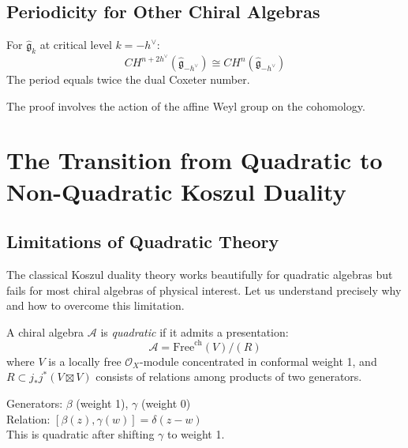 \subsection{Periodicity for Other Chiral Algebras}

\begin{theorem}
For $\hat{\mathfrak{g}}_{k}$ at critical level $k = -h^{\vee}$:
\[
CH^{n+2h^{\vee}}(\hat{\mathfrak{g}}_{-h^{\vee}}) \cong CH^n(\hat{\mathfrak{g}}_{-h^{\vee}})
\]
The period equals twice the dual Coxeter number.
\end{theorem}

The proof involves the action of the affine Weyl group on the cohomology.


\section{The Transition from Quadratic to Non-Quadratic Koszul Duality}

\subsection{Limitations of Quadratic Theory}

The classical Koszul duality theory works beautifully for quadratic algebras but fails for most chiral algebras of physical interest. Let us understand precisely why and how to overcome this limitation.

\begin{definition}
A chiral algebra $\mathcal{A}$ is \emph{quadratic} if it admits a presentation:
\[
\mathcal{A} = \text{Free}^{\text{ch}}(V)/(R)
\]
where $V$ is a locally free $\mathcal{O}_X$-module concentrated in conformal weight 1, and $R \subset j_*j^*(V \boxtimes V)$ consists of relations among products of two generators.
\end{definition}

\begin{example}
Generators: $\beta$ (weight 1), $\gamma$ (weight 0) \\
Relation: $[\beta(z), \gamma(w)] = \delta(z-w)$ \\
This is quadratic after shifting $\gamma$ to weight 1.
\end{example}

